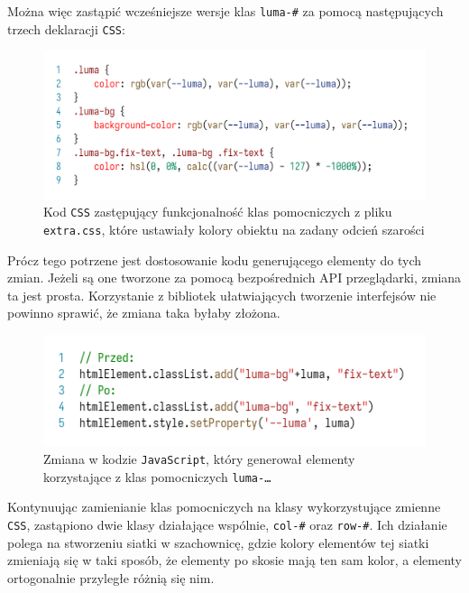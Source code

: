 \documentclass[licencjacka]{pracadypl}
\begin{document}
Można więc zastąpić wcześniejsze wersje klas \texttt{luma-\#} za pomocą następujących trzech deklaracji \texttt{CSS}:

\begin{figure}[H]
  \centering
  \includegraphics[width=\linewidth/\real{1.25}]{images/code-css-luma-all.png}
  \caption{Kod \texttt{CSS} zastępujący funkcjonalność klas pomocniczych z pliku \texttt{extra.css}, które ustawiały kolory obiektu na zadany odcień szarości}
  \label{fig:css-css-luma-all}
\end{figure}

Prócz tego potrzene jest dostosowanie kodu generującego elementy do tych zmian. Jeżeli są one tworzone za pomocą bezpośrednich API przeglądarki, zmiana ta jest prosta. Korzystanie z bibliotek ułatwiających tworzenie interfejsów nie powinno sprawić, że zmiana taka byłaby złożona.

\begin{figure}[H]
  \centering
  \includegraphics[width=\linewidth/\real{1.25}]{images/code-js-luma-adjust.png}
  \caption{Zmiana w kodzie \texttt{JavaScript}, który generował elementy korzystające z klas pomocniczych \texttt{luma-\dots}}
  \label{fig:code-js-luma-adjust}
\end{figure}

Kontynuując zamienianie klas pomocniczych na klasy wykorzystujące zmienne \texttt{CSS}, zastąpiono dwie klasy działające wspólnie, \texttt{col-\#} oraz \texttt{row-\#}. Ich działanie polega na stworzeniu siatki w szachownicę, gdzie kolory elementów tej siatki zmieniają się w taki sposób, \linebreak że elementy po skosie mają ten sam kolor, a elementy ortogonalnie przyległe różnią się nim.
\end{document}
